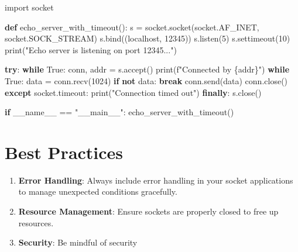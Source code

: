 \documentclass[
  letterpaper,
  DIV=11,
  numbers=noendperiod]{scrreprt}
\newenvironment{Shaded}{\begin{snugshade}}{\end{snugshade}}
\newcommand{\BuiltInTok}[1]{\textcolor[rgb]{0.00,0.23,0.31}{#1}}
\newcommand{\ControlFlowTok}[1]{\textcolor[rgb]{0.00,0.23,0.31}{\textbf{#1}}}
\newcommand{\DecValTok}[1]{\textcolor[rgb]{0.68,0.00,0.00}{#1}}
\newcommand{\ImportTok}[1]{\textcolor[rgb]{0.00,0.46,0.62}{#1}}
\newcommand{\KeywordTok}[1]{\textcolor[rgb]{0.00,0.23,0.31}{\textbf{#1}}}
\newcommand{\NormalTok}[1]{\textcolor[rgb]{0.00,0.23,0.31}{#1}}
\newcommand{\OperatorTok}[1]{\textcolor[rgb]{0.37,0.37,0.37}{#1}}
\newcommand{\SpecialCharTok}[1]{\textcolor[rgb]{0.37,0.37,0.37}{#1}}
\newcommand{\SpecialStringTok}[1]{\textcolor[rgb]{0.13,0.47,0.30}{#1}}
\newcommand{\StringTok}[1]{\textcolor[rgb]{0.13,0.47,0.30}{#1}}
\newcommand{\VariableTok}[1]{\textcolor[rgb]{0.07,0.07,0.07}{#1}}
\providecommand{\tightlist}{%
  \setlength{\itemsep}{0pt}\setlength{\parskip}{0pt}}\usepackage{longtable,booktabs,array}
\begin{document}
\begin{Shaded}
\begin{Highlighting}[]
\ImportTok{import}\NormalTok{ socket}

\KeywordTok{def}\NormalTok{ echo\_server\_with\_timeout():}
\NormalTok{    s }\OperatorTok{=}\NormalTok{ socket.socket(socket.AF\_INET, socket.SOCK\_STREAM)}
\NormalTok{    s.bind((}\StringTok{\textquotesingle{}localhost\textquotesingle{}}\NormalTok{, }\DecValTok{12345}\NormalTok{))}
\NormalTok{    s.listen(}\DecValTok{5}\NormalTok{)}
\NormalTok{    s.settimeout(}\DecValTok{10}\NormalTok{)}
    \BuiltInTok{print}\NormalTok{(}\StringTok{"Echo server is listening on port 12345..."}\NormalTok{)}
    
    \ControlFlowTok{try}\NormalTok{:}
        \ControlFlowTok{while} \VariableTok{True}\NormalTok{:}
\NormalTok{            conn, addr }\OperatorTok{=}\NormalTok{ s.accept()}
            \BuiltInTok{print}\NormalTok{(}\SpecialStringTok{f"Connected by }\SpecialCharTok{\{}\NormalTok{addr}\SpecialCharTok{\}}\SpecialStringTok{"}\NormalTok{)}
            \ControlFlowTok{while} \VariableTok{True}\NormalTok{:}
\NormalTok{                data }\OperatorTok{=}\NormalTok{ conn.recv(}\DecValTok{1024}\NormalTok{)}
                \ControlFlowTok{if} \KeywordTok{not}\NormalTok{ data:}
                    \ControlFlowTok{break}
\NormalTok{                conn.send(data)}
\NormalTok{            conn.close()}
    \ControlFlowTok{except}\NormalTok{ socket.timeout:}
        \BuiltInTok{print}\NormalTok{(}\StringTok{"Connection timed out"}\NormalTok{)}
    \ControlFlowTok{finally}\NormalTok{:}
\NormalTok{        s.close()}

\ControlFlowTok{if} \VariableTok{\_\_name\_\_} \OperatorTok{==} \StringTok{"\_\_main\_\_"}\NormalTok{:}
\NormalTok{    echo\_server\_with\_timeout()}
\end{Highlighting}
\end{Shaded}

\section{Best Practices}\label{best-practices-8}

\begin{enumerate}
\def\labelenumi{\arabic{enumi}.}
\tightlist
\item
  \textbf{Error Handling}: Always include error handling in your socket
  applications to manage unexpected conditions gracefully.
\item
  \textbf{Resource Management}: Ensure sockets are properly closed to
  free up resources.
\item
  \textbf{Security}: Be mindful of security
\end{enumerate}
\end{document}
